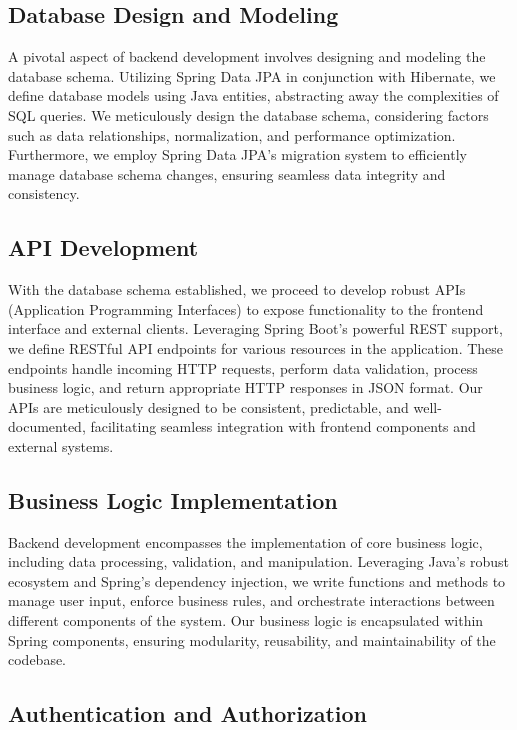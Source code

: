 \documentclass[12pt,a4paper]{report}
\begin{document}
\subsection{Database Design and Modeling}

A pivotal aspect of backend development involves designing and modeling the database schema. Utilizing Spring Data JPA in conjunction with Hibernate, we define database models using Java entities, abstracting away the complexities of SQL queries. We meticulously design the database schema, considering factors such as data relationships, normalization, and performance optimization. Furthermore, we employ Spring Data JPA's migration system to efficiently manage database schema changes, ensuring seamless data integrity and consistency.

\subsection{API Development}

With the database schema established, we proceed to develop robust APIs (Application Programming Interfaces) to expose functionality to the frontend interface and external clients. Leveraging Spring Boot's powerful REST support, we define RESTful API endpoints for various resources in the application. These endpoints handle incoming HTTP requests, perform data validation, process business logic, and return appropriate HTTP responses in JSON format. Our APIs are meticulously designed to be consistent, predictable, and well-documented, facilitating seamless integration with frontend components and external systems.

\subsection{Business Logic Implementation}

Backend development encompasses the implementation of core business logic, including data processing, validation, and manipulation. Leveraging Java's robust ecosystem and Spring's dependency injection, we write functions and methods to manage user input, enforce business rules, and orchestrate interactions between different components of the system. Our business logic is encapsulated within Spring components, ensuring modularity, reusability, and maintainability of the codebase.

\subsection{Authentication and Authorization}
\end{document}
